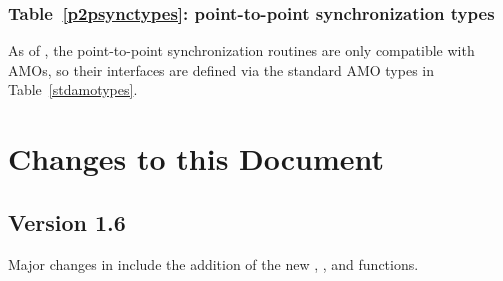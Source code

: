 \subsection{Table~\ref{p2psynctypes}: point-to-point synchronization types}
\label{dep:p2p_sync_types}
As of , the point-to-point synchronization routines are only
compatible with \acp{AMO}, so their interfaces are defined via the
standard \ac{AMO} types in Table~\ref{stdamotypes}.




\chapter{Changes to this Document}\label{sec:changelog}

\section{Version 1.6}
\label{changelog:v1.6}
Major changes in \openshmem[1.6] include the addition of the new
, , and 
functions.

